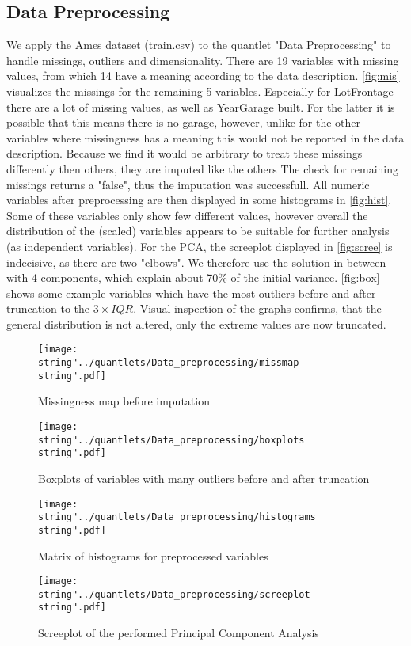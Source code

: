 
\subsection{Data Preprocessing}
We apply the Ames dataset (train.csv) to the quantlet "Data Preprocessing" to handle missings, outliers and dimensionality. 
There are 19 variables with missing values, from which 14 have a meaning according to the data description. 
\autoref{fig:mis} visualizes the missings for the remaining 5 variables. Especially for LotFrontage there are a lot of missing values, as well as YearGarage built. For the latter it is possible that this means there is no garage, however, unlike for the other variables where missingness has a meaning this would not be reported in the data description. Because we find it would be arbitrary to treat these missings differently then others, they are imputed like the others
The check for remaining missings returns a "false", thus the imputation was successfull. 
All numeric variables after preprocessing are then displayed in some histograms in \autoref{fig:hist}. Some of these variables only show few different values, however overall the distribution of the (scaled) variables appears to be suitable for further analysis (as independent variables). 
For the PCA, the screeplot displayed in \autoref{fig:scree} is indecisive, as there are two "elbows".  We therefore use the solution in between with 4 components, which explain about 70\% of the initial variance.  
\autoref{fig:box} shows some example variables which have the most outliers before and after truncation to the $3 \times IQR$. Visual inspection of the graphs confirms, that the general distribution is not altered, only the extreme values are now truncated. 


\begin{figure}[H]
  \centering
\texttt{[image: \\string"../quantlets/Data\_preprocessing/missmap\\string".pdf]}
  \caption{Missingness map before imputation}\label{fig:mis}
\end{figure}
 
\begin{figure}[H]
  \centering
\texttt{[image: \\string"../quantlets/Data\_preprocessing/boxplots\\string".pdf]}
  \caption{Boxplots of variables with many outliers before and after truncation}\label{fig:box}
\end{figure}

 
\begin{figure}[H]
  \centering
\texttt{[image: \\string"../quantlets/Data\_preprocessing/histograms\\string".pdf]}
  \caption{Matrix of histograms for preprocessed variables}\label{fig:step}
\end{figure}


\begin{figure}[H]
  \centering
\texttt{[image: \\string"../quantlets/Data\_preprocessing/screeplot\\string".pdf]}
  \caption{Screeplot of the performed Principal Component Analysis}\label{fig:scree}
\end{figure}



 



